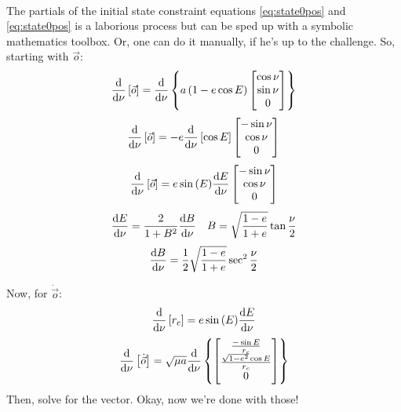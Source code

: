 \paragraph{}
The partials of the initial state constraint equations \ref{eq:state0pos} and \ref{eq:state0pos} is a laborious process but can be sped up with a symbolic mathematics toolbox. Or, one can do it manually, if he's up to the challenge. So, starting with $\vec{o}$:
\begin{equation}
\dv{}{\nu}\left[ \vec{o} \right] = 
\dv{}{\nu}\left\{     a \left(1 - e \cos{E} \right)
\begin{bmatrix}
\cos {\nu} \\ \sin {\nu} \\ 0
\end{bmatrix}  \right\}
\end{equation}
\begin{equation}
\dv{}{\nu}\left[ \vec{o} \right] = 
-e \dv{}{\nu} \left[ \cos{E} \right]
\begin{bmatrix}
-\sin {\nu} \\ \cos {\nu} \\ 0
\end{bmatrix} 
\end{equation}
\begin{equation}
\dv{}{\nu}\left[ \vec{o} \right] = 
e \sin{(E)} \dv{E}{\nu}
\begin{bmatrix}
-\sin {\nu} \\ \cos {\nu} \\ 0
\end{bmatrix} 
\end{equation}
\begin{align}
\dv{E}{\nu} = \frac{2}{1 + B^2} \dv{B}{\nu} &&
B = \sqrt{\frac{1-e}{1+e}} \tan{\frac{\nu}{2}}
\end{align}
\begin{align}
\dv{B}{\nu} = \frac{1}{2}  \sqrt{\frac{1-e}{1+e}}  \sec^2{\frac{\nu}{2}}
\end{align}

Now, for $\dot{\vec{o}}$:
\begin{equation}
\dv{}{\nu}\left[ r_c \right] = e \sin{(E)} \dv{E}{\nu}
\end{equation}
\begin{equation}
\dv{}{\nu}\left[ \dot{\vec{o}} \right] = \sqrt{\mu a}  \dv{}{\nu} \left\{  
\begin{bmatrix}
\frac{-\sin {E}}{r_c} \\ \frac{\sqrt{1 - e^2} \cos{E}}{r_c} \\ 0
\end{bmatrix}
\right\}
\end{equation}
Then, solve for the vector. Okay, now we're done with those!

